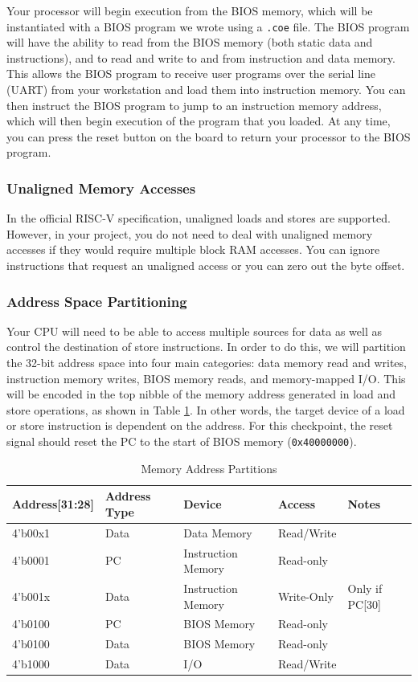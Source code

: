 \documentclass[11pt]{article}
\begin{document}
Your processor will begin execution from the BIOS memory, which will be instantiated with a BIOS program we wrote using a \verb|.coe| file. The BIOS program will have the ability to read from the BIOS memory (both static data and instructions), and to read and write to and from instruction and data memory. This allows the BIOS program to receive user programs over the serial line (UART) from your workstation and load them into instruction memory. You can then instruct the BIOS program to jump to an instruction memory address, which will then begin execution of the program that you loaded. At any time, you can press the reset button on the board to return your processor to the BIOS program.

\subsubsection{Unaligned Memory Accesses}
In the official RISC-V specification, unaligned loads and stores are supported. However, in your project, you do not need to deal with unaligned memory accesses if they would require multiple block RAM accesses. You can ignore instructions that request an unaligned access or you can zero out the byte offset.

\subsubsection{Address Space Partitioning}
Your CPU will need to be able to access multiple sources for data as well as control the destination of store instructions. In order to do this, we will partition the 32-bit address space into four main categories: data memory read and writes, instruction memory writes, BIOS memory reads, and memory-mapped I/O. This will be encoded in the top nibble of the memory address generated in load and store operations, as shown in Table \ref{mem_space1}. In other words, the target device of a load or store instruction is dependent on the address. For this checkpoint, the reset signal should reset the PC to the start of BIOS memory (\verb|0x40000000|).

\begin{table}[hbt]
	\begin{center}
		\caption{Memory Address Partitions}
		\label{mem_space1}
		\begin{tabular}{l l l l l}
			\bottomrule
			\textbf{Address[31:28]} & \textbf{Address Type} & \textbf{Device} & \textbf{Access} & \textbf{Notes} \\
			\midrule
			4'b00x1 & Data & Data Memory & Read/Write &\\
			4'b0001 & PC  &  Instruction Memory & Read-only &\\
			4'b001x & Data & Instruction Memory & Write-Only & Only if PC[30]\\
			4'b0100 & PC  & BIOS Memory & Read-only &\\
			4'b0100 & Data & BIOS Memory & Read-only &\\
			4'b1000 & Data & I/O & Read/Write &\\
			\bottomrule
		\end{tabular}
	\end{center}
\end{table}
\end{document}
